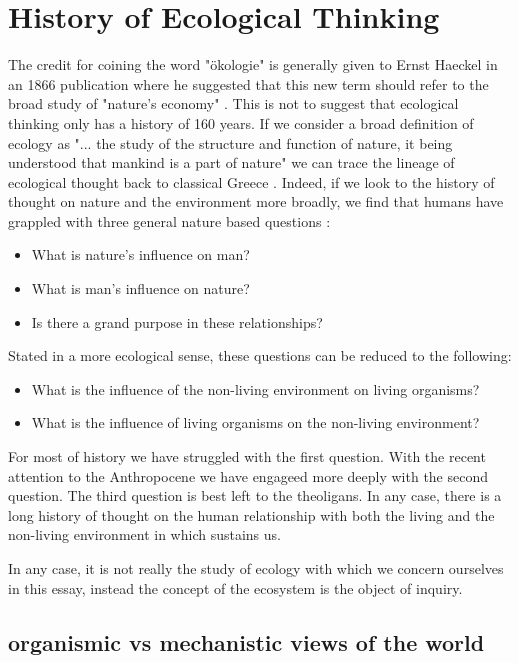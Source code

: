 \section {History of Ecological Thinking}

The credit for coining the word "ökologie" is generally given to Ernst Haeckel in an 1866 publication where he suggested that this new term should refer to the broad study of "nature's economy" \cite{worster_1977}. This is not to suggest that ecological thinking only has a history of 160 years. If we consider a broad definition of ecology as "... the study of the structure and function of nature, it being understood that mankind is a part of nature" we can trace the lineage of ecological thought back to classical Greece \cite{odum_1953}. Indeed, if we look to the history of thought on nature and the environment more broadly, we find that humans have grappled with three general nature based questions \cite{glacken_1967}: \begin{itemize} \item What is nature's influence on man? \item What is man's influence on nature? \item Is there a grand purpose in these relationships? \end{itemize} Stated in a more ecological sense, these questions can be reduced to the following: \begin{itemize} \item What is the influence of the non-living environment on living organisms? \item What is the influence of living organisms on the non-living environment? \end{itemize} For most of history we have struggled with the first question. With the recent attention to the Anthropocene we have engageed more deeply with the second question. The third question is best left to the theoligans. In any case, there is a long history of thought on the human relationship with both the living and the non-living environment in which sustains us.

In any case, it is not really the study of ecology with which we concern ourselves in this essay, instead the concept of the ecosystem is the object of inquiry.


\subsection{organismic vs mechanistic views of the world}

